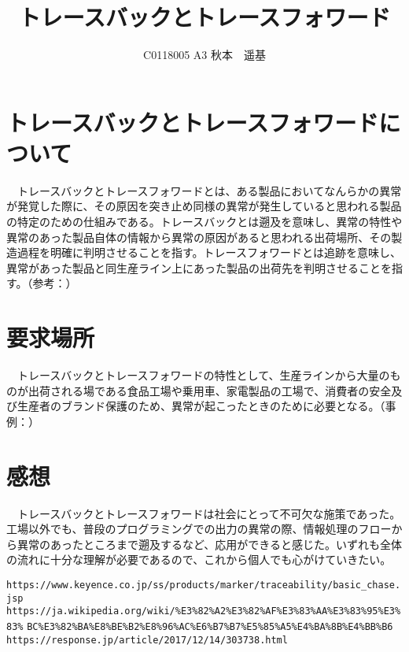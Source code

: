 \documentclass[uplatex]{jsarticle} %
\title{トレースバックとトレースフォワード}
\author{C0118005 A3 秋本　遥基}
\begin{document}
\maketitle

\section{トレースバックとトレースフォワードについて}

　トレースバックとトレースフォワードとは、ある製品においてなんらかの異常が発覚した際に、その原因を突き止め同様の異常が発生していると思われる製品の特定のための仕組みである。トレースバックとは遡及を意味し、異常の特性や異常のあった製品自体の情報から異常の原因があると思われる出荷場所、その製造過程を明確に判明させることを指す。トレースフォワードとは追跡を意味し、異常があった製品と同生産ライン上にあった製品の出荷先を判明させることを指す。（参考：\cite{trace}）

\section{要求場所}

　トレースバックとトレースフォワードの特性として、生産ラインから大量のものが出荷される場である食品工場や乗用車、家電製品の工場で、消費者の安全及び生産者のブランド保護のため、異常が起こったときのために必要となる。（事例：\cite{news1}\cite{news2}）

\section{感想}

　トレースバックとトレースフォワードは社会にとって不可欠な施策であった。工場以外でも、普段のプログラミングでの出力の異常の際、情報処理のフローから異常のあったところまで遡及するなど、応用ができると感じた。いずれも全体の流れに十分な理解が必要であるので、これから個人でも心がけていきたい。

\begin{thebibliography}{99}
   \verb+https://www.keyence.co.jp/ss/products/marker/traceability/basic_chase.jsp+
   \verb+https://ja.wikipedia.org/wiki/%E3%82%A2%E3%82%AF%E3%83%AA%E3%83%95%E3%83%+
  \verb+BC%E3%82%BA%E8%BE%B2%E8%96%AC%E6%B7%B7%E5%85%A5%E4%BA%8B%E4%BB%B6+
   \verb+https://response.jp/article/2017/12/14/303738.html+
\end{thebibliography}
\end{document}
